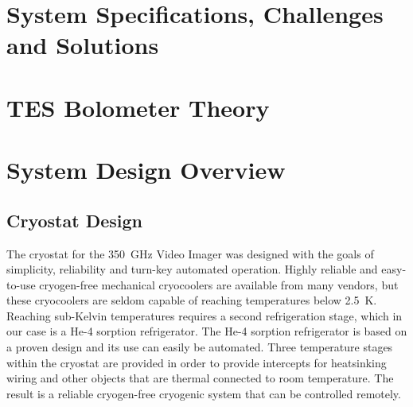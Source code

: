 \documentclass[10pt,twocolumn,article]{memoir}
\newcommand*{\Imager}{350~GHz Video Imager\xspace}
\begin{document}
\chapter{System Specifications, Challenges and Solutions}\label{c:specs}

\chapter{TES Bolometer Theory}\label{c:tes}

\chapter{System Design Overview}\label{c:sys-design}

\section{Cryostat Design}\label{s-cryo-design}

The cryostat for the \Imager was designed with the goals of simplicity, reliability and turn-key automated operation.
Highly reliable and easy-to-use cryogen-free mechanical cryocoolers are available from many vendors, but these cryocoolers are seldom capable of reaching temperatures below 2.5~K.
Reaching sub-Kelvin temperatures requires a second refrigeration stage, which in our case is a He-4 sorption refrigerator.
The He-4 sorption refrigerator is based on a proven design and its use can easily be automated.
Three temperature stages within the cryostat are provided in order to provide intercepts for heatsinking wiring and other objects that are thermal connected to room temperature. 
The result is a reliable cryogen-free cryogenic system that can be controlled remotely.
\end{document}
